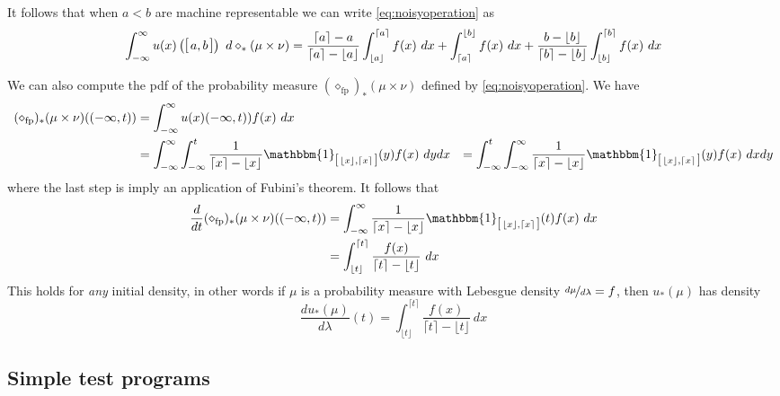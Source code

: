 \documentclass[10pt,a4paper]{article}
\newcommand{\one}{\mathbbm{1}}
\newcommand{\ceil}[1]{\lceil #1 \rceil}
\newcommand{\floor}[1]{\lfloor #1 \rfloor}
\newcommand{\intvl}[1]{\mathlarger{\left[\right.}  #1 \mathlarger{\left.\right]}}
\newcommand{\fintvl}[1][x]{\intvl{\floor{#1},\ceil{#1}}}
\newcommand{\fp}{_{\mathrm{fp}}}
\begin{document}
It follows that when $a<b$ are machine representable we can write \eqref{eq:noisyoperation} as
\begin{align*}
\int_{-\infty}^{\infty} u(x)\left(\intvl{a,b}\right) ~d\diamond_\ast(\mu\times \nu)=\frac{\ceil{a}-a}{\ceil{a}-\floor{a}}\int_{\floor{a}}^{\ceil{a}}  f(x) ~dx + \int_{\ceil{a}}^{\floor{b}} f(x)~dx +
\frac{b-\floor{b}}{\ceil{b}-\floor{b}}\int_{\floor{b}}^{\ceil{b}}  f(x) ~dx
\end{align*}

We can also compute the pdf of the probability measure $(\diamond\fp)_\ast(\mu\times \nu)$ defined by \eqref{eq:noisyoperation}. We have
\begin{align*}
(\diamond\fp)_\ast(\mu\times \nu)((-\infty,t))&=\int_{-\infty}^\infty u(x)(-\infty,t))f(x) ~dx\\
&=\int_{-\infty}^\infty \int_{-\infty}^t \frac{1}{\ceil{x}-\floor{x}} \one_{\fintvl}(y) f(x) ~dy dx
&=\int_{-\infty}^t\int_{-\infty}^\infty\frac{1}{\ceil{x}-\floor{x}} \one_{\fintvl}(y) f(x) ~dx dy
\end{align*}
where the last step is imply an application of Fubini's theorem. It follows that
\begin{align*}
\frac{d}{dt}(\diamond\fp)_\ast(\mu\times \nu)((-\infty,t))&=\int_{-\infty}^\infty\frac{1}{\ceil{x}-\floor{x}} \one_{\fintvl}(t) f(x) ~dx\\
&=\int_{\floor{t}}^{\ceil{t}}\frac{f(x)}{\ceil{t}-\floor{t}} ~dx
\end{align*}
This holds for \emph{any} initial density, in other words if $\mu$ is a probability measure with Lebesgue density $\nicefrac{d\mu}{d\lambda}=f$, then $u_\ast(\mu)$ has density
\[
\frac{du_\ast(\mu)}{d\lambda}(t)=\int_{\floor{t}}^{\ceil{t}}\frac{f(x)}{\ceil{t}-\floor{t}} ~dx
\]

\subsection*{Simple test programs}




 
\end{document}
